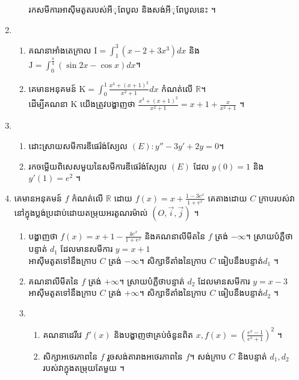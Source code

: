 \documentclass{officialexam}
\begin{document}
\begin{enumerate}[I]
\begin{enumerate}[1]
		រកសមីការអាស៊ីមតូតរបស់អីុពែបូល និងសង់អីុពែបូលនេះ ។
	\end{enumerate}
	\item \begin{enumerate}[1]
		\item គណនាអាំងតេក្រាល $\mathrm{I}=\int_{1}^{3}\left(x-2+3x^3\right)dx$ និង $\mathrm{J}=\int_{0}^{\frac{\pi}{4}}\left(\sin2x-\cos x\right)dx$។ 
		\item  គេមានអនុគមន៍ $\mathrm{K}=\int_{0}^{1}\frac{x^3+\left(x+1\right)^2}{x^2+1}dx$ កំណត់លើ $\mathbb{R}$។\\ 
		ដើម្បីគណនា $\mathrm{K}$ យើងត្រូវបង្ហាញថា $\frac{x^3+\left(x+1\right)^2}{x^2+1}=x+1+\frac{x}{x^2+1}$ ។
	\end{enumerate}
	\item \begin{enumerate}[k]
		\item ដោះស្រាយសមីការឌីផេរ៉ង់ស្យែល $(E): y''-3y'+2y=0$។
		\item រកចម្លើយពិសេសមួយនៃសមីការឌីផេរ៉ង់ស្យែល $(E)$ ដែល $y(0)=1$ និង $y'(1)=e^2$ ។
	\end{enumerate}
	\item គេមានអនុគមន៍ $f$ កំណត់លើ $\mathbb{R}$ ដោយ $f(x)=x+\frac{1-3e^x}{1+e^x}$ គេតាងដោយ $C$ ក្រាបរបស់វានៅក្នុងប្លង់ប្រដាប់ដោយតម្រុយអរតូណរម៉ាល់ $\left(O, \vec{i}, \vec{j}\right)$ ។
	\begin{enumerate}[1]
		\item បង្ហាញថា $f(x)=x+1-\frac{4e^x}{1+e^x}$ និងគណនាលីមីតនៃ $f$ ត្រង់ $-\infty$។ ស្រាយបំភ្លឺថាបន្ទាត់ $d_1$ ដែលមានសមីការ $y=x+1$\\ អាស៊ីមតូតទៅនឹងក្រាប $C$ ត្រង់ $-\infty$។ សិក្សាទីតាំងនៃក្រាប $C$ ធៀបនឹងបន្ទាត់​ $d_1$ ។
		\item គណនាលីមីតនៃ $f$ ត្រង់ $+\infty$។ ស្រាយបំភ្លឺថាបន្ទាត់ $d_2$ ដែលមានសមីការ $y=x-3$\\ អាស៊ីមតូតទៅនឹងក្រាប $C$ ត្រង់ $+\infty$។ សិក្សាទីតាំងនៃក្រាប $C$ ធៀបនឹងបន្ទាត់​ $d_2$ ។
		\item 
		\begin{enumerate}[k]
			\item គណនាដេរីវេ $f'(x)$ និងបង្ហាញថាគ្រប់ចំនួនពិត $x, f(x)=\left(\frac{e^x-1}{e^x+1}\right)^2$ ។
			\item សិក្សាអថេរភាពនៃ $f$ រួចសង់តារាងអថេរភាពនៃ $f$។ សង់ក្រាប $C$ និងបន្ទាត់ $d_1, d_2$ របស់វាក្នុងតម្រុយតែមួយ ។
		\end{enumerate}
	\end{enumerate}
\end{enumerate}
\borderline{\bigg[ចម្លើយ\bigg]}\\
\end{document}
